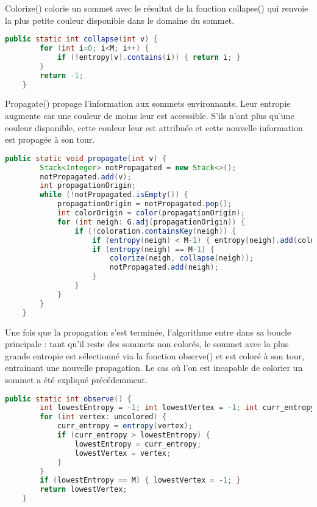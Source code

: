 Colorize() colorie un sommet avec le résultat de la fonction collapse() qui renvoie la plus petite couleur disponible dans le domaine du sommet.

\begin{lstlisting}[language=java]
    public static int collapse(int v) {
        for (int i=0; i<M; i++) {
            if (!entropy[v].contains(i)) { return i; }
        }
        return -1;
    }
\end{lstlisting}

Propagate() propage l'information aux sommets environnants. Leur entropie augmente car une couleur de moins leur est accessible. S'ils n'ont plus qu'une couleur disponible, cette couleur leur est attribuée et cette nouvelle information est propagée à son tour.


\begin{lstlisting}[language=java]
    public static void propagate(int v) {
        Stack<Integer> notPropagated = new Stack<>();
        notPropagated.add(v);
        int propagationOrigin;
        while (!notPropagated.isEmpty()) {
            propagationOrigin = notPropagated.pop();
            int colorOrigin = color(propagationOrigin);
            for (int neigh: G.adj(propagationOrigin)) {
                if (!coloration.containsKey(neigh)) {
                    if (entropy(neigh) < M-1) { entropy[neigh].add(colorOrigin); }
                    if (entropy(neigh) == M-1) {
                        colorize(neigh, collapse(neigh));
                        notPropagated.add(neigh);
                    }
                }
            }
        }
    }
\end{lstlisting}

Une fois que la propagation s'est terminée, l'algorithme entre dans sa boucle principale : tant qu'il reste des sommets non colorés, le sommet avec la plus grande entropie est sélectionné via la fonction observe() et est coloré à son tour, entrainant une nouvelle propagation. Le cas où l'on est incapable de colorier un sommet a été expliqué précédemment.


\begin{lstlisting}[language=java]
    public static int observe() {
        int lowestEntropy = -1; int lowestVertex = -1; int curr_entropy;
        for (int vertex: uncolored) {
            curr_entropy = entropy(vertex);
            if (curr_entropy > lowestEntropy) {
                lowestEntropy = curr_entropy;
                lowestVertex = vertex;
            }
        }
        if (lowestEntropy == M) { lowestVertex = -1; }
        return lowestVertex;
    }
\end{lstlisting}



